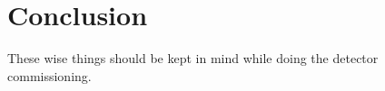 %
%
%
%
%
%


\section{Conclusion}
These wise things should be kept in mind while doing the detector commissioning.

